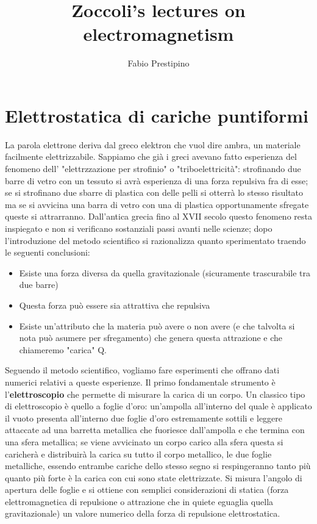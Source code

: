 \documentclass[10pt,a4paper]{article}
\author{Fabio Prestipino}
\title{Zoccoli's lectures on electromagnetism}
\begin{document}
	\maketitle
	\newpage
	\tableofcontents
	\newpage
\section{Elettrostatica di cariche puntiformi}
La parola elettrone deriva dal greco elektron che vuol dire ambra, un materiale facilmente elettrizzabile. Sappiamo che già i greci avevano fatto esperienza del fenomeno dell' "elettrzzazione per strofinio" o "triboelettricità": strofinando due barre di vetro con un tessuto si avrà esperienza di una forza repulsiva fra di esse; se si strofinano due sbarre di plastica con delle pelli si otterrà lo stesso risultato ma se si avvicina una barra di vetro con una di plastica opportunamente sfregate queste si attrarranno. Dall'antica grecia fino al XVII secolo questo fenomeno resta inspiegato e non si verificano sostanziali passi avanti nelle scienze; dopo l'introduzione del metodo scientifico si razionalizza quanto sperimentato traendo le seguenti conclusioni:
\begin{itemize}
	\item Esiste una forza diversa da quella gravitazionale (sicuramente trascurabile tra due barre)
	\item Questa forza può essere sia attrattiva che repulsiva
	\item Esiste un'attributo che la materia può avere o non avere (e che talvolta si nota può asumere per sfregamento) che genera questa attrazione e che chiameremo "carica" Q.
\end{itemize}
Seguendo il metodo scientifico, vogliamo fare esperimenti che offrano dati numerici relativi a queste esperienze. Il primo fondamentale strumento è l'\textbf{elettroscopio} che permette di misurare la carica di un corpo. Un classico tipo di elettroscopio è quello a foglie d'oro: un'ampolla all'interno del quale è applicato il vuoto presenta all'interno due foglie d'oro estremamente sottili e leggere attaccate ad una barretta metallica che fuoriesce dall'ampolla e che termina con una sfera metallica; se viene avvicinato un corpo carico alla sfera questa si caricherà e distribuirà la carica su tutto il corpo metallico, le due foglie metalliche, essendo entrambe cariche dello stesso segno si respingeranno tanto più quanto più forte è la carica con cui sono state elettrizzate. Si misura l'angolo di apertura delle foglie e si ottiene con semplici considerazioni di statica (forza elettromagnetica di repulsione o attrazione che in quiete eguaglia quella gravitazionale) un valore numerico della forza di repulsione elettrostatica. 
\end{document}
